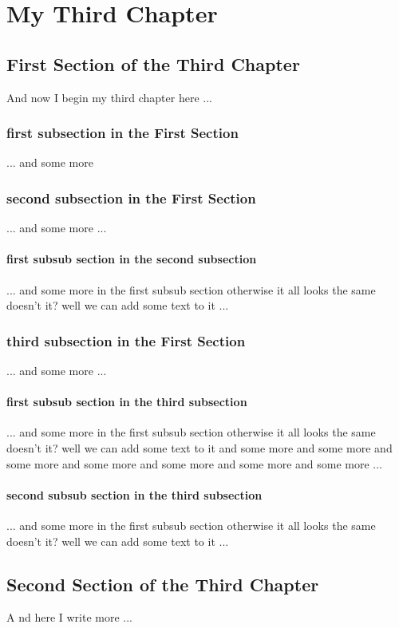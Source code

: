 \chapter{My Third Chapter}

\graphicspath{{Chapters/Chapter3/Chapter3Figs/PNG/}{Chapters/Chapter3/Chapter3Figs/PDF/}{Chapters/Chapter3/Chapter3Figs/}}


\section{First Section of the Third Chapter}

And now I begin my third chapter here ...

\subsection{first subsection in the First Section}
... and some more 

\subsection{second subsection in the First Section}
... and some more ...

\subsubsection{first subsub section in the second subsection}
... and some more in the first subsub section otherwise it all looks the same
doesn't it? well we can add some text to it ...

\subsection{third subsection in the First Section}
... and some more ...

\subsubsection{first subsub section in the third subsection}
... and some more in the first subsub section otherwise it all looks the same
doesn't it? well we can add some text to it and some more and some more and
some more and some more and some more and some more and some more ...

\subsubsection{second subsub section in the third subsection}
... and some more in the first subsub section otherwise it all looks the same
doesn't it? well we can add some text to it ...

\section{Second Section of the Third Chapter}
A	nd here I write more ...

